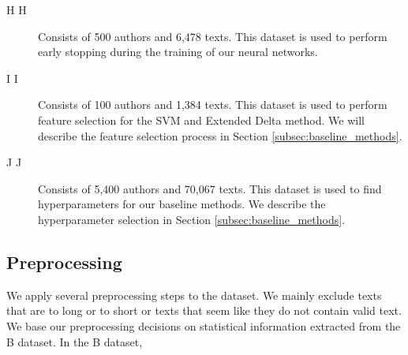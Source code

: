 \begin{description}
    \item[\glsdesc{H} \gls{H}]

        Consists of 500 authors and 6,478 texts. This dataset is used to perform
        early stopping during the training of our neural networks.

    \item[\glsdesc{I} \gls{I}]

        Consists of 100 authors and 1,384 texts. This dataset is used to
        perform feature selection for the \gls{SVM} and Extended Delta
        method. We will describe the feature selection process in Section
        \ref{subsec:baseline_methods}.

    \item[\glsdesc{J} \gls{J}]

        Consists of 5,400 authors and 70,067 texts. This dataset is used to find
        hyperparameters for our baseline methods. We describe the hyperparameter
        selection in Section \ref{subsec:baseline_methods}.

\end{description}


\subsection{Preprocessing}

We apply several preprocessing steps to the dataset. We mainly exclude texts
that are to long or to short or texts that seem like they do not contain valid
text. We base our preprocessing decisions on statistical information extracted
from the B dataset. In the B dataset,

